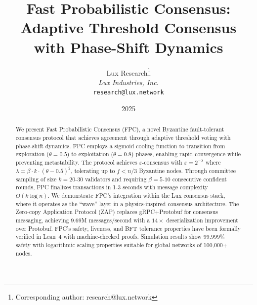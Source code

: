 \documentclass[11pt,a4paper]{article}
\title{Fast Probabilistic Consensus: Adaptive Threshold Consensus with Phase-Shift Dynamics}
\author{
Lux Research\thanks{Corresponding author: research@lux.network}\\
\textit{Lux Industries, Inc.}\\
\texttt{research@lux.network}
}
\date{2025}
\begin{document}
\luxcoverpage

\begin{abstract}
We present Fast Probabilistic Consensus (FPC), a novel Byzantine fault-tolerant consensus protocol that achieves agreement through adaptive threshold voting with phase-shift dynamics. FPC employs a sigmoid cooling function to transition from exploration ($\theta = 0.5$) to exploitation ($\theta = 0.8$) phases, enabling rapid convergence while preventing metastability. The protocol achieves $\varepsilon$-consensus with $\varepsilon = 2^{-\lambda}$ where $\lambda = \beta \cdot k \cdot (\theta - 0.5)^2$, tolerating up to $f < n/3$ Byzantine nodes. Through committee sampling of size $k = 20$-$30$ validators and requiring $\beta = 5$-$10$ consecutive confident rounds, FPC finalizes transactions in 1-3 seconds with message complexity $O(k \log n)$. We demonstrate FPC's integration within the Lux consensus stack, where it operates as the ``wave'' layer in a physics-inspired consensus architecture. The Zero-copy Application Protocol (ZAP) replaces gRPC+Protobuf for consensus messaging, achieving 9.69M messages/second with a $14\times$ deserialization improvement over Protobuf. FPC's safety, liveness, and BFT tolerance properties have been formally verified in Lean~4 with machine-checked proofs. Simulation results show 99.999\% safety with logarithmic scaling properties suitable for global networks of 100,000+ nodes.
\end{abstract}




















\end{document}
